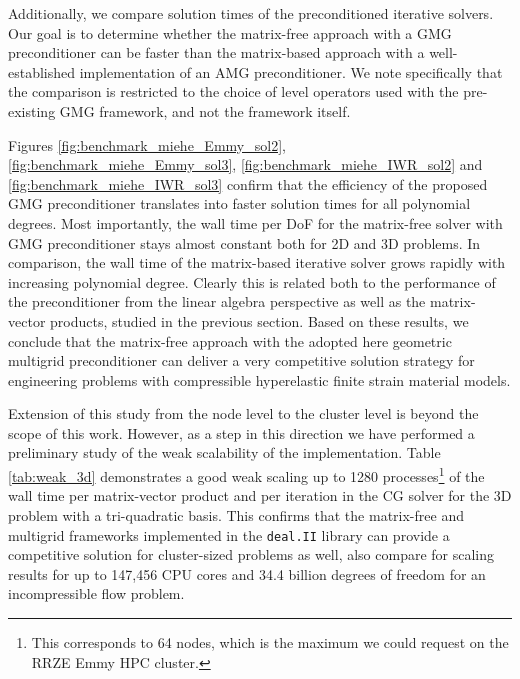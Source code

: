 \documentclass[times,doublespace]{nmeauth}
\newcommand{\changeDD}[1]{#1}
\newcommand{\changeJP}[1]{#1}
\begin{document}
\changeJP{%
Additionally, we compare solution times of the preconditioned iterative solvers.
Our goal is to \changeJP{determine} whether the matrix-free approach with a GMG preconditioner can be faster than the matrix-based approach with a well-established implementation of an AMG preconditioner.
We note specifically that the comparison is restricted to the choice of level operators used with the pre-existing GMG framework, and not the framework itself.
}
Figures \ref{fig:benchmark_miehe_Emmy_sol2}, \ref{fig:benchmark_miehe_Emmy_sol3}, \ref{fig:benchmark_miehe_IWR_sol2} and \ref{fig:benchmark_miehe_IWR_sol3} confirm that the efficiency of the proposed GMG preconditioner translates into faster solution times for \changeDD{all} polynomial degrees.
\changeDD{Most importantly, the wall time per DoF for the matrix-free solver with GMG preconditioner stays almost constant both for 2D and 3D problems.
\changeJP{In comparison}, the wall time of the matrix-based iterative solver grows rapidly with increasing polynomial degree.
Clearly this is related both to the performance of the preconditioner from the linear algebra perspective as well as the matrix-vector products, studied in the previous section.
Based on these results, we conclude that the matrix-free approach with the adopted here geometric multigrid preconditioner can deliver a very competitive solution strategy for \changeJP{engineering problems
with compressible hyperelastic} finite strain material models.}

\changeJP{Extension of this study from the node level to the cluster level is beyond the scope of this work.
However, as a step in this direction we have performed a preliminary study of the weak scalability of the implementation.
Table \ref{tab:weak_3d} demonstrates a good weak scaling up to 1280 processes\footnote{%
This corresponds to 64 nodes, which is the maximum we could request on the RRZE Emmy HPC cluster.
} of the wall time per matrix-vector product and per iteration in the CG solver for the 3D problem with a tri-quadratic basis.
This confirms that the matrix-free and multigrid frameworks implemented in the \texttt{deal.II} library can provide a competitive solution for cluster-sized problems as well,
also compare \cite[Figure 7]{Krank2017} for scaling results for up to 147,456 CPU cores and 34.4 billion degrees of freedom for an incompressible flow problem.
}
\end{document}
